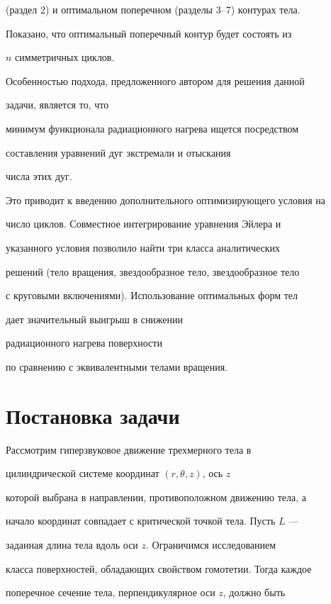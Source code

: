 (раздел 2) и оптимальном поперечном (разделы 3--7) контурах тела.


Показано, что оптимальный поперечный контур будет состоять из


$n$ симметричных циклов.





Особенностью подхода, предложенного автором для решения данной


задачи, является то, что


минимум функционала радиационного нагрева ищется посредством


составления уравнений дуг экстремали и отыскания


числа этих дуг.


Это приводит к введению дополнительного оптимизирующего условия на


число циклов. Совместное интегрирование уравнения Эйлера и


указанного условия позволило найти три класса аналитических


решений (тело вращения, звездообразное тело, звездообразное тело


с круговыми включениями). Использование оптимальных форм тел


дает значительный выигрыш в снижении


радиационного нагрева поверхности


по сравнению с эквивалентными телами вращения.





\section{Постановка задачи}





Рассмотрим гиперзвуковое движение трехмерного тела в


цилиндрической системе координат $(r, \theta, z)$, ось $z$


которой выбрана в направлении, противоположном движению тела, а


начало координат совпадает с критической точкой тела. Пусть $L$ ---


заданная длина тела вдоль оси $z$. Ограничимся исследованием


класса поверхностей, обладающих свойством гомотетии. Тогда каждое


поперечное сечение тела, перпендикулярное оси $z$, должно быть


